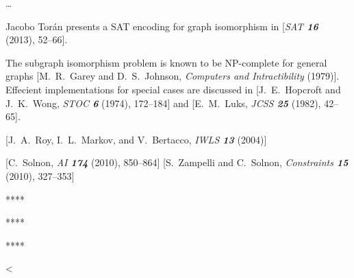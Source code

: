 \medskip{} \dots




\medskip{}  Jacobo Tor\'an presents a SAT encoding
for graph isomorphism in [{\sl SAT\/ \bf 16} (2013), 52--66].

The subgraph isomorphism problem is known to be NP-complete for general graphs
[M.\ R.\ Garey and D.\ S.\ Johnson, {\sl Computers and Intractibility} (1979)].
Effecient implementations for special cases are discussed in [J.\ E.\ Hopcroft
and J.\ K.\ Wong, {\sl STOC\/ \bf 6} (1974), 172--184] and [E.\ M.\ Luks, {\sl
JCSS\/ \bf 25} (1982), 42--65].

[J.\ A.\ Roy, I.\ L.\ Markov, and V.\ Bertacco, {\sl IWLS\/ \bf 13} (2004)]

[C.\ Solnon, {\sl AI\/ \bf 174} (2010), 850--864]  [S.\ Zampelli and C.\ Solnon, {\sl Constraints\/ \bf 15} (2010), 327--353]

\medskip{}

\centerline{****}


\centerline{****}


\centerline{****}




\bye
<